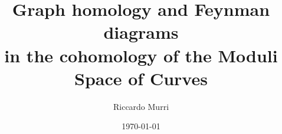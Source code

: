 

\title{%
  Graph homology and Feynman diagrams \\
  in the cohomology of the Moduli Space of Curves
}
\date{\today}
\author{Riccardo Murri}
\address{%
  The Abdus Salam I.C.T.P. \\
  strada Costiera, 11 \\
  34014 Trieste \\
  Italy
}

\maketitle

\setcounter{tocdepth}{2} %

\tableofcontents

